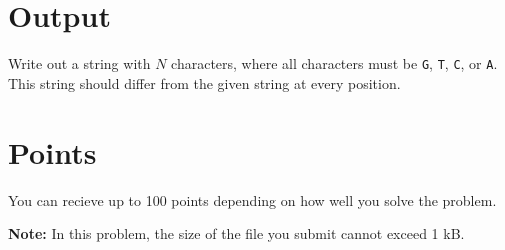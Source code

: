\section*{Output}
\noindent
Write out a string with $N$ characters, where all characters must be \texttt{G}, \texttt{T}, \texttt{C}, or \texttt{A}. 
This string should differ from the given string at every position.



\section*{Points}
You can recieve up to 100 points depending on how well you solve the problem.

\textbf{Note:} In this problem, the size of the file you submit cannot exceed 1 kB.

